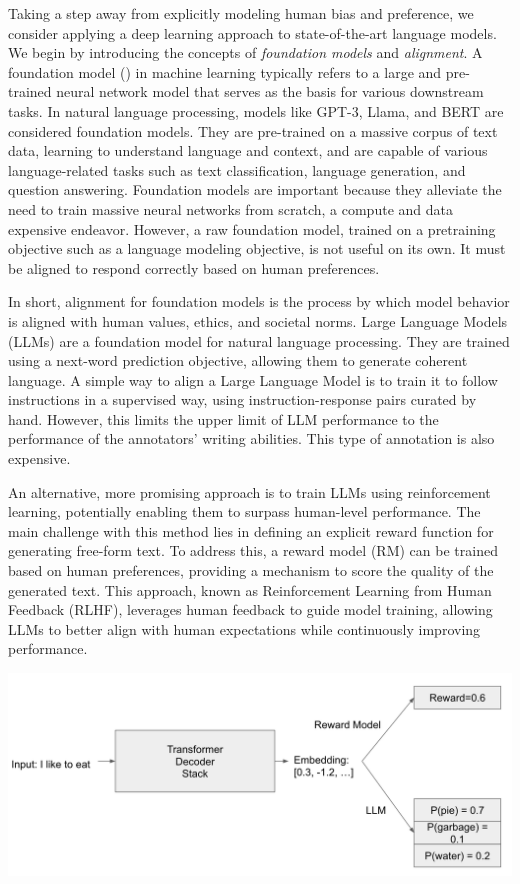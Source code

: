 \documentclass[
  letterpaper,
  DIV=11,
  numbers=noendperiod,
  oneside]{scrreprt}
\theoremstyle{remark}
\begin{document}
Taking a step away from explicitly modeling human bias and preference,
we consider applying a deep learning approach to state-of-the-art
language models. We begin by introducing the concepts of
\emph{foundation models} and \emph{alignment}. A foundation model
() in machine learning
typically refers to a large and pre-trained neural network model that
serves as the basis for various downstream tasks. In natural language
processing, models like GPT-3, Llama, and BERT are considered foundation
models. They are pre-trained on a massive corpus of text data, learning
to understand language and context, and are capable of various
language-related tasks such as text classification, language generation,
and question answering. Foundation models are important because they
alleviate the need to train massive neural networks from scratch, a
compute and data expensive endeavor. However, a raw foundation model,
trained on a pretraining objective such as a language modeling
objective, is not useful on its own. It must be aligned to respond
correctly based on human preferences.

In short, alignment for foundation models is the process by which model
behavior is aligned with human values, ethics, and societal norms. Large
Language Models (LLMs) are a foundation model for natural language
processing. They are trained using a next-word prediction objective,
allowing them to generate coherent language. A simple way to align a
Large Language Model is to train it to follow instructions in a
supervised way, using instruction-response pairs curated by hand.
However, this limits the upper limit of LLM performance to the
performance of the annotators' writing abilities. This type of
annotation is also expensive.

An alternative, more promising approach is to train LLMs using
reinforcement learning, potentially enabling them to surpass human-level
performance. The main challenge with this method lies in defining an
explicit reward function for generating free-form text. To address this,
a reward model (RM) can be trained based on human preferences, providing
a mechanism to score the quality of the generated text. This approach,
known as Reinforcement Learning from Human Feedback (RLHF), leverages
human feedback to guide model training, allowing LLMs to better align
with human expectations while continuously improving performance.

\includegraphics{src/Figures/arch.png}
\end{document}
